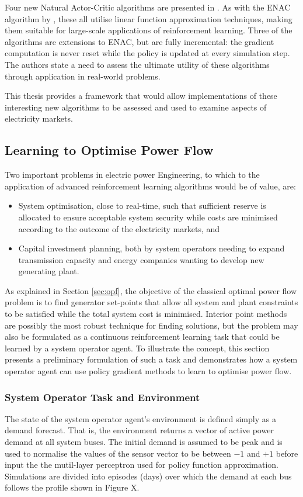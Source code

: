 Four new Natural Actor-Critic algorithms are presented in .
As with the ENAC algorithm by , these all utilise linear
function approximation techniques, making them suitable for large-scale applications of
reinforcement learning.  Three of the algorithms are extensions to ENAC, but
are fully incremental: the gradient computation is never reset while the policy
is updated at every simulation step.  The authors state a need to assess the
ultimate utility of these algorithms through application in real-world
problems.

This thesis provides a framework that would allow implementations of these
interesting new algorithms to be assessed and used to examine aspects of
electricity markets.

\subsection{Learning to Optimise Power Flow}
Two important problems in electric power Engineering, to which to the
application of advanced reinforcement learning algorithms would be of value,
are:
\begin{itemize}
  \item System optimisation, close to real-time, such that sufficient reserve
  is allocated to ensure acceptable system security while costs are minimised
  according to the outcome of the electricity markets, and
  \item Capital investment planning, both by system operators needing to expand
  transmission capacity and energy companies wanting to develop new generating
  plant.
\end{itemize}


As explained in Section \ref{sec:opf}, the objective of the classical optimal
power flow problem is to find generator set-points that allow all system and
plant constraints to be satisfied while the total system cost is minimised.
Interior point methods are possibly the most robust technique for finding
solutions, but the problem may also be formulated as a continuous
reinforcement learning task that could be learned by a system operator agent.
To illustrate the concept, this section presents a preliminary formulation of
such a task and demonstrates how a system operator agent can use policy
gradient methods to learn to optimise power flow.

\subsubsection{System Operator Task and Environment}
The state of the system operator agent's environment is defined simply as a
demand forecast.  That is, the environment returns a vector of active power
demand at all system buses.  The initial demand is assumed to be peak and is
used to normalise the values of the sensor vector to be between $-1$ and $+1$
before input the the mutil-layer perceptron used for policy function
approximation.  Simulations are divided into episodes (days) over which the
demand at each bus follows the profile shown in Figure X.

